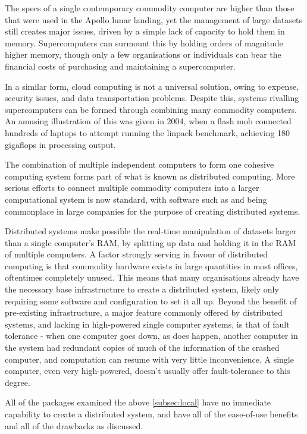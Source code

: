 
The specs of a single contemporary commodity computer are higher than
those that were used in the Apollo lunar landing, yet the management of
large datasets still creates major issues, driven by a simple lack of
capacity to hold them in memory. Supercomputers can surmount this by
holding orders of magnitude higher memory, though only a few
organisations or individuals can bear the financial costs of purchasing
and maintaining a supercomputer.

In a similar form, cloud computing is not a universal solution, owing to
expense, security issues, and data transportation problems. Despite
this, systems rivalling supercomputers can be formed through combining
many commodity computers. An amusing illustration of this was given in
2004, when a flash mob connected hundreds of laptops to attempt running
the linpack benchmark, achieving 180 gigaflops in processing
output\cite{perry2004flashcomp}.

The combination of multiple independent computers to form one cohesive
computing system forms part of what is known as distributed computing.
More serious efforts to connect multiple commodity computers into a
larger computational system is now standard, with software such as
 and  being commonplace in large companies for the purpose of
creating distributed systems.

Distributed systems make possible the real-time manipulation of datasets
larger than a single computer's RAM, by splitting up data and holding it
in the RAM of multiple computers. A factor strongly serving in favour of
distributed computing is that commodity hardware exists in large
quantities in most offices, oftentimes completely unused. This means
that many organisations already have the necessary base infrastructure
to create a distributed system, likely only requiring some software and
configuration to set it all up. Beyond the benefit of pre-existing
infrastructure, a major feature commonly offered by distributed systems,
and lacking in high-powered single computer systems, is that of fault
tolerance - when one computer goes down, as does happen, another
computer in the system had redundant copies of much of the information
of the crashed computer, and computation can resume with very little
inconvenience. A single computer, even very high-powered, doesn't
usually offer fault-tolerance to this degree.

All of the packages examined the above \cref{subsec:local} have no
immediate capability to create a distributed system, and have all of the
ease-of-use benefits and all of the drawbacks as discussed.

